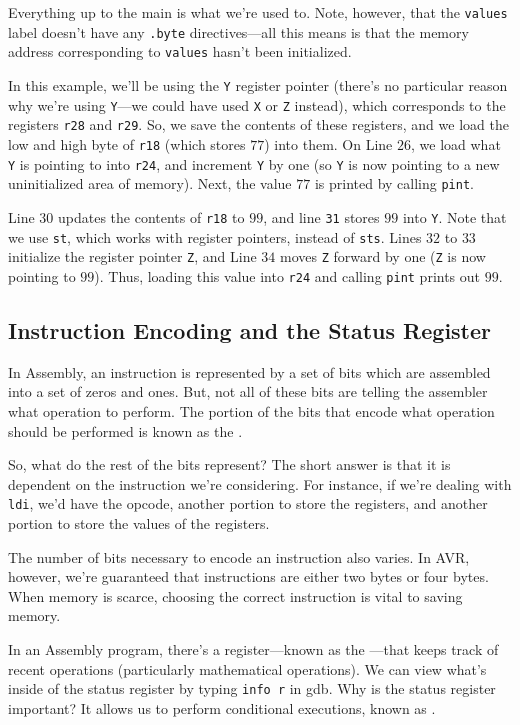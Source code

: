 Everything up to the main is what we're used to. Note, however, that the \verb!values! label doesn't have any \verb!.byte! directives---all this means is that the memory address corresponding to \verb!values! hasn't been initialized.

In this example, we'll be using the \verb!Y! register pointer (there's no particular reason why we're using \verb!Y!---we could have used \verb!X! or \verb!Z! instead), which corresponds to the registers \verb!r28! and \verb!r29!. So, we save the contents of these registers, and we load the low and high byte of \verb!r18! (which stores $77$) into them. On Line $26$, we load what \verb!Y! is pointing to into \verb!r24!, and increment \verb!Y! by one (so \verb!Y! is now pointing to a new uninitialized area of memory). Next, the value $77$ is printed by calling \verb!pint!.

Line $30$ updates the contents of \verb!r18! to $99$, and line \verb!31! stores $99$ into \verb!Y!. Note that we use \verb!st!, which works with register pointers, instead of \verb!sts!. Lines $32$ to $33$ initialize the register pointer \verb!Z!, and Line $34$ moves \verb!Z! forward by one (\verb!Z! is now pointing to $99$). Thus, loading this value into \verb!r24! and calling \verb!pint! prints out $99$.

\subsection{Instruction Encoding and the Status Register}

In Assembly, an instruction is represented by a set of bits which are assembled into a set of zeros and ones. But, not all of these bits are telling the assembler what operation to perform. The portion of the bits that encode what operation should be performed is known as the . 

So, what do the rest of the bits represent? The short answer is that it is dependent on the instruction we're considering. For instance, if we're dealing with \verb!ldi!, we'd have the opcode, another portion to store the registers, and another portion to store the values of the registers. 

The number of bits necessary to encode an instruction also varies. In AVR, however, we're guaranteed that instructions are either two bytes or four bytes. When memory is scarce, choosing the correct instruction is vital to saving memory.


In an Assembly program, there's a register---known as the ---that keeps track of recent operations (particularly mathematical operations). We can view what's inside of the status register by typing \verb!info r! in gdb. Why is the status register important? It allows us to perform conditional executions, known as . 

